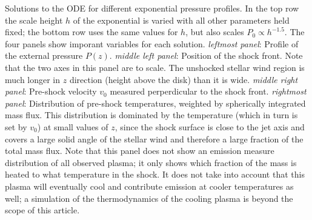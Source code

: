 \label{fig:p_ext}
Solutions to the ODE for different exponential pressure profiles. In the top row the scale height $h$ of the exponential is varied with all other parameters held fixed; the bottom row uses the same values for $h$, but also scales $P_0\propto h^{-1.5}$.
The four panels show imporant variables for each solution. \emph{leftmost panel}: Profile of the external pressure $P(z)$. \emph{middle left panel}: Position of the shock front. Note that the two axes in this panel are to scale. The unshocked stellar wind region is much longer in $z$ direction (height above the disk) than it is wide. \emph{middle right panel}: Pre-shock velocity $v_0$ measured perperdicular to the shock front. \emph{rightmost panel}: Distribution of pre-shock temperatures, weighted by spherically integrated mass flux. This distribution is dominated by the temperature (which in turn is set by $v_0$) at small values of $z$, since the shock surface is close to the jet axis and covers a large solid angle of the stellar wind and therefore a large fraction of the total mass flux. Note that this panel does not show an emission measure distribution of all observed plasma; it only shows which fraction of the mass is heated to what temperature in the shock. It does not take into account that this plasma will eventually cool and contribute emission at cooler temperatures as well; a simulation of the thermodynamics of the cooling plasma is beyond the scope of this article.